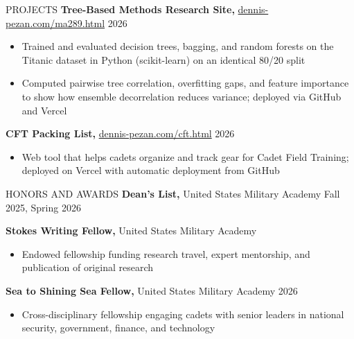 \documentclass{resume}
\begin{document}
\begin{rSection}{PROJECTS} \itemsep -3pt
\textbf{Tree-Based Methods Research Site,} \href{https://dennis-pezan.com/ma289.html}{dennis-pezan.com/ma289.html} \hfill{2026}
\vspace{-5pt}
\begin{itemize}
\setlength\itemsep{-1.5ex}
    \item Trained and evaluated decision trees, bagging, and random forests on the Titanic dataset in Python (scikit-learn) on an identical 80/20 split
    \item Computed pairwise tree correlation, overfitting gaps, and feature importance to show how ensemble decorrelation reduces variance; deployed via GitHub and Vercel
\end{itemize}

\textbf{CFT Packing List,} \href{https://dennis-pezan.com/cft.html}{dennis-pezan.com/cft.html} \hfill{2026}
\vspace{-5pt}
\begin{itemize}
\setlength\itemsep{-1.5ex}
    \item Web tool that helps cadets organize and track gear for Cadet Field Training; deployed on Vercel with automatic deployment from GitHub
\end{itemize}
\end{rSection}

\begin{rSection}{HONORS AND AWARDS} \itemsep -3pt
\textbf{Dean's List,} United States Military Academy \hfill{Fall 2025, Spring 2026}

\textbf{Stokes Writing Fellow,} United States Military Academy
\vspace{-5pt}
\begin{itemize}
\setlength\itemsep{-1.5ex}
    \item Endowed fellowship funding research travel, expert mentorship, and publication of original research
\end{itemize}

\textbf{Sea to Shining Sea Fellow,} United States Military Academy \hfill{2026}
\vspace{-5pt}
\begin{itemize}
\setlength\itemsep{-1.5ex}
    \item Cross-disciplinary fellowship engaging cadets with senior leaders in national security, government, finance, and technology
\end{itemize}
\end{rSection}
\end{document}
